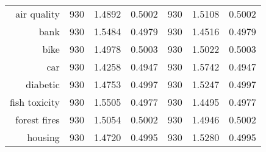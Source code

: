 \begin{table}[H]
{\begin{tabular}{rcccccc}
			air quality                        & 930                                        & \cellcolor[rgb]{ .776,  .937,  .808}\textcolor[rgb]{ 0,  .38,  0}{1.4892}          & 0.5002          & 930                               & 1.5108                                                                    & 0.5002          \\
			bank                               & 930                                        & 1.5484                                                                             & 0.4979          & 930                               & \cellcolor[rgb]{ .776,  .937,  .808}\textcolor[rgb]{ 0,  .38,  0}{1.4516} & 0.4979          \\
			bike                               & 930                                        & \cellcolor[rgb]{ .776,  .937,  .808}\textcolor[rgb]{ 0,  .38,  0}{1.4978}          & 0.5003          & 930                               & 1.5022                                                                    & 0.5003          \\
			car                                & 930                                        & \cellcolor[rgb]{ .776,  .937,  .808}\textcolor[rgb]{ 0,  .38,  0}{1.4258}          & 0.4947          & 930                               & 1.5742                                                                    & 0.4947          \\
			diabetic                           & 930                                        & \cellcolor[rgb]{ .776,  .937,  .808}\textcolor[rgb]{ 0,  .38,  0}{1.4753}          & 0.4997          & 930                               & 1.5247                                                                    & 0.4997          \\
			fish toxicity                      & 930                                        & 1.5505                                                                             & 0.4977          & 930                               & \cellcolor[rgb]{ .776,  .937,  .808}\textcolor[rgb]{ 0,  .38,  0}{1.4495} & 0.4977          \\
			forest fires                       & 930                                        & 1.5054                                                                             & 0.5002          & 930                               & \cellcolor[rgb]{ .776,  .937,  .808}\textcolor[rgb]{ 0,  .38,  0}{1.4946} & 0.5002          \\
			housing                            & 930                                        & \cellcolor[rgb]{ .776,  .937,  .808}\textcolor[rgb]{ 0,  .38,  0}{1.4720}          & 0.4995          & 930                               & 1.5280                                                                    & 0.4995          \\

\end{tabular}}
\end{table}
